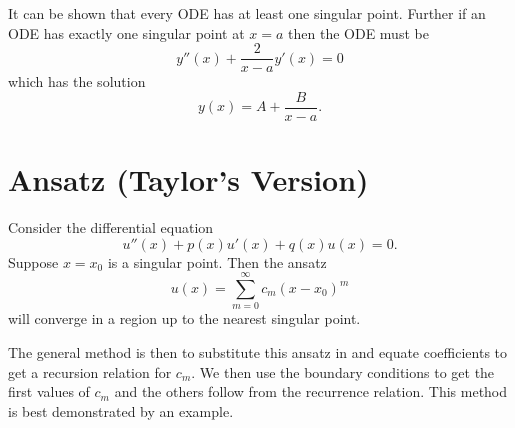 \documentclass[fleqn]{NotesClass}
\begin{document}
    It can be shown that every ODE has at least one singular point.
    Further if an ODE has exactly one singular point at \(x = a\) then the ODE must be
    \begin{equation}
        y''(x) + \frac{2}{x - a} y'(x) = 0
    \end{equation}
    which has the solution
    \begin{equation}
        y(x) = A + \frac{B}{x - a}.
    \end{equation}
    
    \section{Ansatz (Taylor's Version)}\label{sec:Anzatz (Taylor's Version)}
    Consider the differential equation
    \begin{equation}
        u''(x) + p(x)u'(x) + q(x)u(x) = 0.
    \end{equation}
    Suppose \(x = x_0\) is a singular point.
    Then the ansatz
    \begin{equation}
        u(x) = \sum_{m=0}^{\infty} c_m(x - x_0)^{m}
    \end{equation}
    will converge in a region up to the nearest singular point.
    
    The general method is then to substitute this ansatz in and equate coefficients to get a recursion relation for \(c_m\).
    We then use the boundary conditions to get the first values of \(c_m\) and the others follow from the recurrence relation.
    This method is best demonstrated by an example.
    
\end{document}
